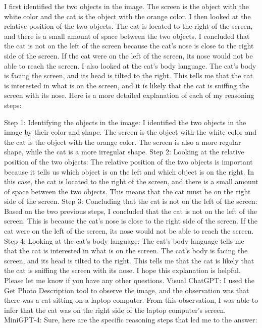 \begin{enumerate}
        I first identified the two objects in the image. The screen is the object with the white color and the cat is the object with the orange color.
        I then looked at the relative position of the two objects. The cat is located to the right of the screen, and there is a small amount of space between the two objects.
        I concluded that the cat is not on the left of the screen because the cat's nose is close to the right side of the screen. If the cat were on the left of the screen, its nose would not be able to reach the screen.
        I also looked at the cat's body language. The cat's body is facing the screen, and its head is tilted to the right. This tells me that the cat is interested in what is on the screen, and it is likely that the cat is sniffing the screen with its nose.
        Here is a more detailed explanation of each of my reasoning steps:
        
        Step 1: Identifying the objects in the image: I identified the two objects in the image by their color and shape. The screen is the object with the white color and the cat is the object with the orange color. The screen is also a more regular shape, while the cat is a more irregular shape.
        Step 2: Looking at the relative position of the two objects: The relative position of the two objects is important because it tells us which object is on the left and which object is on the right. In this case, the cat is located to the right of the screen, and there is a small amount of space between the two objects. This means that the cat must be on the right side of the screen.
        Step 3: Concluding that the cat is not on the left of the screen: Based on the two previous steps, I concluded that the cat is not on the left of the screen. This is because the cat's nose is close to the right side of the screen. If the cat were on the left of the screen, its nose would not be able to reach the screen.
        Step 4: Looking at the cat's body language: The cat's body language tells me that the cat is interested in what is on the screen. The cat's body is facing the screen, and its head is tilted to the right. This tells me that the cat is likely that the cat is sniffing the screen with its nose.
        I hope this explanation is helpful. Please let me know if you have any other questions.
        \subitem Visual ChatGPT: I used the Get Photo Description tool to observe the image, and the observation was that there was a cat sitting on a laptop computer. From this observation, I was able to infer that the cat was on the right side of the laptop computer's screen.
        \subitem MiniGPT-4: Sure, here are the specific reasoning steps that led me to the answer:


\end{enumerate}
